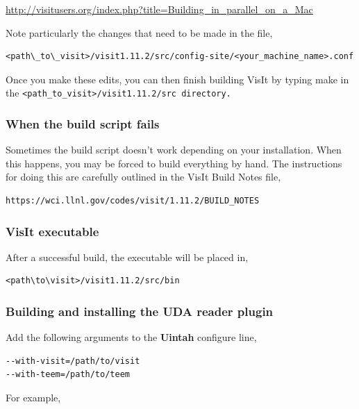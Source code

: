 \documentclass[12pt]{article}
\begin{document}
\url{http://visitusers.org/index.php?title=Building_in_parallel_on_a_Mac}

  
Note particularly the changes that need to be made in the file, 

\begin{verbatim}
<path\_to\_visit>/visit1.11.2/src/config-site/<your_machine_name>.conf
\end{verbatim}

\normalfont Once you make these edits, you can then finish building VisIt by typing make in the \tt <path\_to\_visit>/visit1.11.2/src \normalfont directory.  

\subsubsection{When the build script fails}
\label{sec:WhenTheBuildsSriptFails}

Sometimes the build script doesn't work depending on your
installation. When this happens, you may be forced to build everything
by hand. The instructions for doing this are carefully outlined in the
VisIt Build Notes file,

\begin{verbatim}
https://wci.llnl.gov/codes/visit/1.11.2/BUILD_NOTES
\end{verbatim}

\subsubsection{VisIt executable}
\label{sec:VisItExecutable}

After a successful build, the executable will be placed in,

\begin{verbatim}
<path\to\visit>/visit1.11.2/src/bin
\end{verbatim}

\subsubsection{Building and installing the UDA reader plugin}
\label{sec:BuildingAndInstallingUDAPlugin}

Add the following arguments to the \textbf{Uintah} configure line,

\begin{verbatim}
--with-visit=/path/to/visit 
--with-teem=/path/to/teem
\end{verbatim}

For example,
\end{document}
